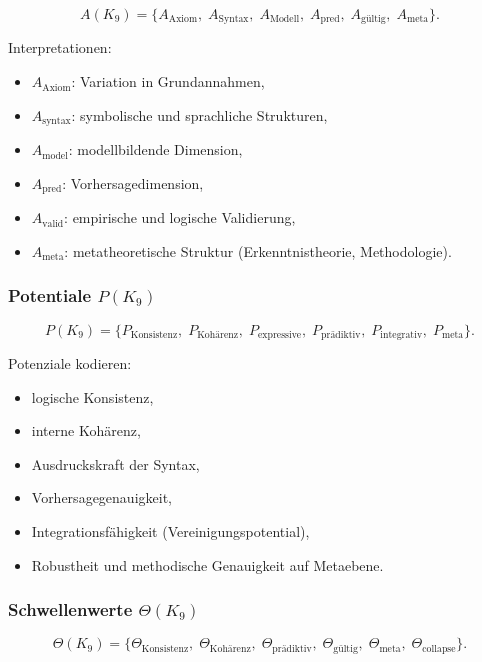 \[
A(K_9)=
\{
A_{\mathrm{Axiom}},\;
A_{\mathrm{Syntax}},\;
A_{\mathrm{Modell}},\;
A_{\mathrm{pred}},\;
A_{\mathrm{gültig}},\;
A_{\mathrm{meta}}
\}.
\]

Interpretationen:
\begin{itemize}
    \item $A_{\mathrm{Axiom}}$: Variation in Grundannahmen,
    \item $A_{\mathrm{syntax}}$: symbolische und sprachliche Strukturen,
    \item $A_{\mathrm{model}}$: modellbildende Dimension,
    \item $A_{\mathrm{pred}}$: Vorhersagedimension,
    \item $A_{\mathrm{valid}}$: empirische und logische Validierung,
    \item $A_{\mathrm{meta}}$: metatheoretische Struktur (Erkenntnistheorie, Methodologie).
\end{itemize}

\subsubsection{Potentiale \texorpdfstring{$P(K_9)$}{P(K_9)}}

\[
P(K_9)=
\{
P_{\mathrm{Konsistenz}},\;
P_{\mathrm{Kohärenz}},\;
P_{\mathrm{expressive}},\;
P_{\mathrm{prädiktiv}},\;
P_{\mathrm{integrativ}},\;
P_{\mathrm{meta}}
\}.
\]

Potenziale kodieren:
\begin{itemize}
    \item logische Konsistenz,
    \item interne Kohärenz,
    \item Ausdruckskraft der Syntax,
    \item Vorhersagegenauigkeit,
    \item Integrationsfähigkeit (Vereinigungspotential),
    \item Robustheit und methodische Genauigkeit auf Metaebene.
\end{itemize}

\subsubsection{Schwellenwerte \texorpdfstring{$\Theta(K_9)$}{\Theta(K_9)}}

\[
\Theta(K_9)=
\{
\Theta_{\mathrm{Konsistenz}},\;
\Theta_{\mathrm{Kohärenz}},\;
\Theta_{\mathrm{prädiktiv}},\;
\Theta_{\mathrm{gültig}},\;
\Theta_{\mathrm{meta}},\;
\Theta_{\mathrm{collapse}}
\}.
\]

